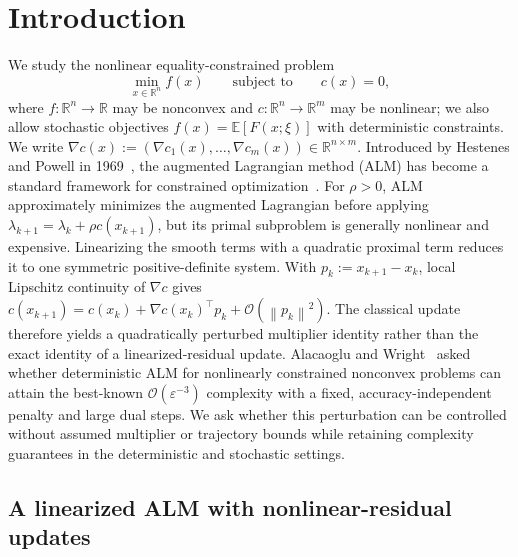 \documentclass[11pt]{article}
\theoremstyle{definition}
\theoremstyle{remark}
\numberwithin{equation}{section}
\numberwithin{figure}{section}
\numberwithin{table}{section}
\numberwithin{algorithm}{section}
\newcommand{\R}{\mathbb{R}}
\newcommand{\E}{\mathbb{E}}
\newcommand{\cO}{\mathcal{O}}
\newcommand{\eps}{\varepsilon}
\newcommand{\norm}[1]{\left\lVert #1\right\rVert}
\newcommand{\grad}{\nabla}
\begin{document}
\section{Introduction}
\label{sec:introduction}

We study the nonlinear equality-constrained problem
\begin{equation}
    \min_{x\in\R^n} f(x)
    \qquad \text{subject to}\qquad c(x)=0,
    \label{eq:problem}
\end{equation}
where $f:\R^n\to\R$ may be nonconvex and $c:\R^n\to\R^m$ may be nonlinear; we also allow stochastic objectives $f(x)=\E[F(x;\xi)]$ with deterministic constraints.  We write $\grad c(x):=(\grad c_1(x),\ldots,\grad c_m(x))\in\R^{n\times m}$. Introduced by Hestenes and Powell in 1969~\cite{Hestenes1969,Powell1969}, the augmented Lagrangian method (ALM) has become a standard framework for constrained optimization~\cite{Bertsekas1982,NocedalWright2006,Rockafellar1973}.
For $\rho>0$, ALM approximately minimizes the augmented Lagrangian before applying $\lambda_{k+1}=\lambda_k+\rho c(x_{k+1})$, but its primal subproblem is generally nonlinear and expensive.  Linearizing the smooth terms with a quadratic proximal term reduces it to one symmetric positive-definite system.  With $p_k:=x_{k+1}-x_k$, local Lipschitz continuity of $\grad c$ gives
$c(x_{k+1})=c(x_k)+\grad c(x_k)^\top p_k+\cO(\norm{p_k}^2)$.
The classical update therefore yields a quadratically perturbed multiplier identity rather than the exact identity of a linearized-residual update. Alacaoglu and Wright~\cite{AlacaogluWright2024} asked whether deterministic ALM for nonlinearly constrained nonconvex problems can attain the best-known $\cO(\eps^{-3})$ complexity with a fixed, accuracy-independent penalty and
large dual steps.  We ask whether this perturbation can be controlled without assumed multiplier or trajectory bounds while retaining complexity guarantees in the deterministic and stochastic settings.

\subsection{A linearized ALM with nonlinear-residual updates}
\end{document}
